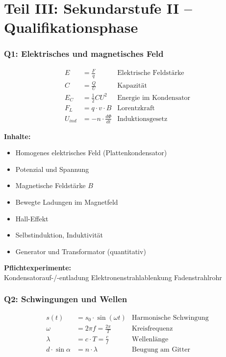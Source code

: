 \documentclass[11pt,a4paper]{article}
\begin{document}
\part*{Teil III: Sekundarstufe II -- Qualifikationsphase}

\section{Q1: Elektrisches und magnetisches Feld}

\begin{formelbox}
\begin{align*}
E &= \frac{F}{q} & \text{Elektrische Feldstärke} \\
C &= \frac{Q}{U} & \text{Kapazität} \\
E_C &= \frac{1}{2} C U^2 & \text{Energie im Kondensator} \\
F_L &= q \cdot v \cdot B & \text{Lorentzkraft} \\
U_{ind} &= -n \cdot \frac{d\Phi}{dt} & \text{Induktionsgesetz}
\end{align*}
\end{formelbox}

\textbf{Inhalte:}
\begin{itemize}[leftmargin=0.5cm, itemsep=1pt]
\item Homogenes elektrisches Feld (Plattenkondensator)
\item Potenzial und Spannung
\item Magnetische Feldstärke $B$
\item Bewegte Ladungen im Magnetfeld
\item Hall-Effekt
\item Selbstinduktion, Induktivität
\item Generator und Transformator (quantitativ)
\end{itemize}

\begin{experimentbox}
\textbf{Pflichtexperimente:}\\
Kondensatorauf-/-entladung \textbullet{} Elektronenstrahlablenkung \textbullet{} Fadenstrahlrohr
\end{experimentbox}

\section{Q2: Schwingungen und Wellen}

\begin{formelbox}
\begin{align*}
s(t) &= s_0 \cdot \sin(\omega t) & \text{Harmonische Schwingung} \\
\omega &= 2\pi f = \frac{2\pi}{T} & \text{Kreisfrequenz} \\
\lambda &= c \cdot T = \frac{c}{f} & \text{Wellenlänge} \\
d \cdot \sin\alpha &= n \cdot \lambda & \text{Beugung am Gitter}
\end{align*}
\end{formelbox}
\end{document}
